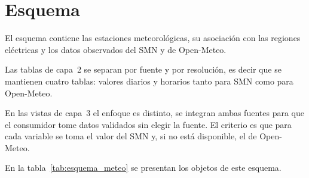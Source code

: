 \section{Esquema \texorpdfstring{}{METEO}}
\label{sec:apendice_meteo}

El esquema  contiene las estaciones meteorológicas, su asociación con las regiones eléctricas y los datos observados del SMN y de Open-Meteo.

Las tablas de capa~2 se separan por fuente y por resolución, es decir que se mantienen cuatro tablas:   valores diarios y horarios tanto para SMN como para Open-Meteo.

En las vistas de capa~3 el enfoque es distinto, se integran ambas fuentes para que el consumidor tome datos validados sin elegir la fuente. El criterio es que para cada variable se toma el valor del SMN y, si no está disponible, el de Open-Meteo.

En la tabla~\ref{tab:esquema_meteo} se presentan los objetos de este esquema. 

